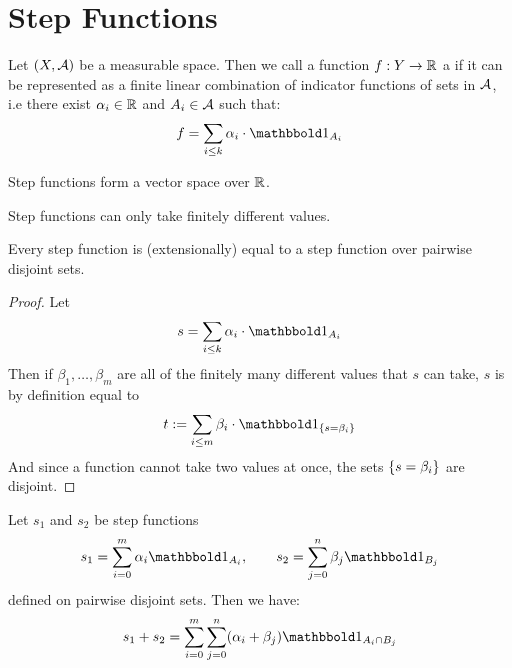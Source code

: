 \section{Step Functions}
\begin{definition}
	Let $(X, \mathcal{A})$ be a measurable space. Then we call a function $f : Y \to \mathbb{R}$ a  if it can be represented as a finite linear combination of indicator functions of sets in $\mathcal{A}$, i.e there exist $\alpha_i \in \mathbb{R}$ and $A_i \in \mathcal{A}$ such that:
	\begin{align*}
		f = \sum_{i \leq k} \alpha_i \cdot \boldone_{A_i}
	\end{align*}
\end{definition}
\begin{proposition}
	Step functions form a vector space over $\mathbb{R}$.
\end{proposition}
\begin{proposition}
	Step functions can only take finitely different values.
\end{proposition}
\begin{proposition}
	Every step function is (extensionally) equal to a step function over pairwise disjoint sets.
\end{proposition}
\begin{proof}
	Let 
	\begin{align*}
		s = \sum_{i \leq k} \alpha_i \cdot \boldone_{A_i}
	\end{align*}
	Then if $\beta_1, \hdots, \beta_m$ are all of the finitely many different values that $s$ can take, $s$ is by definition equal to
	\begin{align*}
		t := \sum_{i \leq m} \beta_i \cdot \boldone_{\lr{s = \beta_i}}
	\end{align*}
	And since a function cannot take two values at once, the sets $\qty{s = \beta_i}$ are disjoint.
\end{proof}
\begin{lemma}
	 Let $s_1$ and $s_2$ be step functions
	\begin{align*}
		s_1 = \sum_{i = 0}^m \alpha_i \boldone_{A_i}, \qquad
		s_2 = \sum_{j = 0}^n \beta_j \boldone_{B_j}
	\end{align*}
	defined on pairwise disjoint sets. Then we have:
	\begin{align*}
		s_1 + s_2 = \sum_{i = 0}^m \sum_{j = 0}^n (\alpha_i + \beta_j)\boldone_{A_i \cap B_j}
	\end{align*}
\end{lemma}
